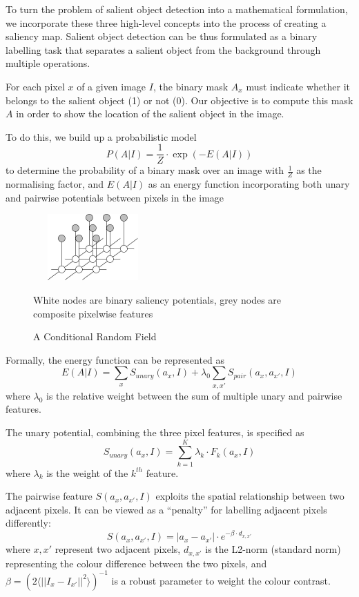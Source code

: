 \documentclass[10pt,twocolumn,letterpaper]{article}
\newcommand{\SUM}{\sum\limits}
\begin{document}
To turn the problem of salient object detection into a mathematical formulation, we incorporate these three high-level concepts into the process of creating a saliency map.  Salient object detection can be thus formulated as a binary labelling task that separates a salient object from the background through multiple operations.

For each pixel $x$ of a given image $I$, the binary mask $A_x$ must indicate whether it belongs to the salient object (1) or not (0). Our objective is to compute this mask $A$ in order to show the location of the salient object in the image.

To do this, we build up a probabilistic model $$P(A|I)=\frac{1}{Z}\cdot \exp(-E(A|I))$$ to determine the probability of a binary mask over an image with $\frac{1}{Z}$ as the normalising factor, and $E(A|I)$ as an energy function incorporating both unary and pairwise potentials between pixels in the image

\begin{figure}[h]
    \begin{center}
        \includegraphics[width=1.8in,height=1in]{./Figures/mrf.jpg} \\
        \caption{A Conditional Random Field }
        \small White nodes are binary saliency potentials, grey nodes are composite pixelwise features
        \end{center}
\end{figure}

Formally, the energy function can be represented as $$E(A|I) = \SUM_x S_{unary}(a_x,I) + \lambda_0 \SUM_{x,x'}S_{pair}(a_x,a_{x'},I)$$ where $\lambda_0$ is the relative weight between the sum of multiple unary  and pairwise features. 

The unary potential, combining the three pixel features, is specified as $$S_{unary}(a_x,I) = \SUM_{k=1}^K \lambda_k \cdot F_k(a_x,I)$$ where $\lambda_k$ is the  weight of the $k^{th}$ feature. %

The pairwise feature $S(a_x,a_{x'},I)$ exploits the spatial relationship between two adjacent pixels.  It can be viewed as a ``penalty'' for labelling adjacent pixels differently: $$S(a_x,a_{x'},I) = |a_x-a_{x'}| \cdot e^{-\beta\cdot d_{x,x'}}$$ where $x,x'$ represent two adjacent pixels, $d_{x,x'}$ is the L2-norm (standard norm) representing the colour difference between the two pixels, and $\beta=(2\langle||I_x-I_{x'}||^2\rangle)^{-1}$ is a robust parameter to weight the colour contrast.
\end{document}

